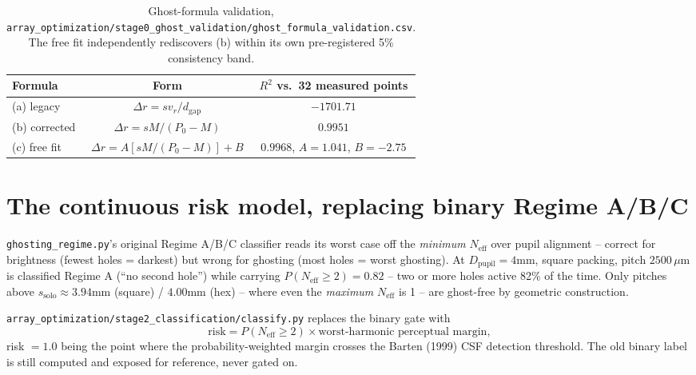 \documentclass[11pt]{report}
\newcommand{\dgap}{d_{\text{gap}}}
\newcommand{\vr}{v_r}
\newcommand{\Neff}{N_{\text{eff}}}
\begin{document}
\begin{table}[h!]
\centering\small
\begin{tabular}{lcc}
\toprule
\textbf{Formula} & \textbf{Form} & \textbf{$R^2$ vs.\ 32 measured points} \\
\midrule
(a) legacy & $\Delta r = s\vr/\dgap$ & $-1701.71$ \\
(b) corrected & $\Delta r = sM/(P_0-M)$ & $0.9951$ \\
(c) free fit & $\Delta r = A[sM/(P_0-M)]+B$ & $0.9968$, $A{=}1.041$, $B{=}-2.75$ \\
\bottomrule
\end{tabular}
\caption{Ghost-formula validation, \texttt{array\_optimization/stage0\_ghost\_validation/ghost\_formula\_validation.csv}.
The free fit independently rediscovers (b) within its own pre-registered 5\% consistency band.}
\end{table}

\section{The continuous risk model, replacing binary Regime A/B/C}
\label{sec:riskmodel}
\texttt{ghosting\_regime.py}'s original Regime A/B/C classifier reads its worst case off the
\emph{minimum} $\Neff$ over pupil alignment -- correct for brightness (fewest holes =
darkest) but wrong for ghosting (most holes = worst ghosting). At $D_{\text{pupil}}{=}4$mm,
square packing, pitch $2500\,\mu$m is classified Regime A (``no second hole'') while carrying
$P(\Neff{\geq}2){=}0.82$ -- two or more holes active 82\% of the time. Only pitches above
$s_{\text{solo}}\approx3.94$mm (square) / $4.00$mm (hex) -- where even the \emph{maximum}
$\Neff$ is 1 -- are ghost-free by geometric construction.

\texttt{array\_optimization/stage2\_classification/classify.py} replaces the binary gate with
\[
\text{risk} = P(\Neff\geq2)\times\text{worst-harmonic perceptual margin},
\]
risk $=1.0$ being the point where the probability-weighted margin crosses the Barten (1999)
CSF detection threshold. The old binary label is still computed and exposed for reference,
never gated on.
\end{document}
